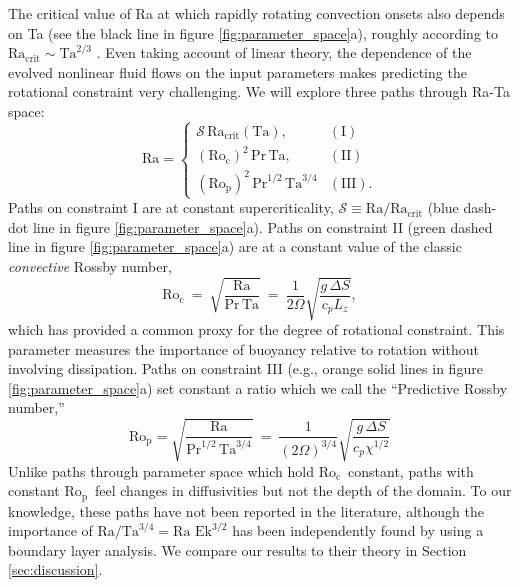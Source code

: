 \documentclass[twocolumn, amsmath, amsfonts, amssymb, trackchanges]{aastex62}
\newcommand{\pro}{\ensuremath{\text{Ro}_{\text{p}}}}
\newcommand{\con}{\ensuremath{\text{Ro}_{\text{c}}}}
\begin{document}
The critical value of Ra at which rapidly rotating convection onsets also depends on Ta (see the black line in figure \ref{fig:parameter_space}a),
roughly according to $\text{Ra}_{\text{crit}} \sim \text{Ta}^{2/3}$ \citep{Chandrasekhar,calkins&all2015a}.
Even taking account of linear theory, the dependence of the evolved nonlinear fluid 
flows on the input parameters makes predicting the rotational constraint very challenging. 
We will explore three paths through Ra-Ta space:
\begin{equation}
    \text{Ra} = 
    \begin{cases}
    \mathcal{S}\,\text{Ra}_\text{crit}(\text{Ta}), & (\text{I})\\
    (\con)^2 \, \text{Pr}\, \text{Ta}, & (\text{II}) \\
    (\pro)^2\, \text{Pr}^{1/2}\, \text{Ta}^{3/4} & (\text{III}).
    \end{cases}
    \label{eqn:paths}
\end{equation}
Paths on constraint I are at constant supercriticality, 
$\mathcal{S} \equiv \text{Ra}/\text{Ra}_{\text{crit}}$
(blue dash-dot line in figure \ref{fig:parameter_space}a).
Paths on constraint II (green dashed line in figure \ref{fig:parameter_space}a)
are at a constant value of the classic
\textit{convective} Rossby number, 
\begin{equation}
\con \ = \   \sqrt{ \frac{\text{Ra}}{\text{Pr}\, \text{Ta} } } \ 
= \  \frac{1}{2 \Omega } \sqrt{\frac{g \, \Delta  S}{c_{p} L_{z}}},
\label{eqn:roc_defn}
\end{equation}
which has provided \citep[e.g., ][]{julien&all1996, brummell&all1996} 
a common proxy for the degree of rotational constraint.
This parameter measures the importance of buoyancy relative to rotation without 
involving dissipation.  
Paths on constraint
III (e.g., orange solid lines in figure \ref{fig:parameter_space}a) 
set constant a ratio which we call the ``Predictive Rossby number,'' 
\begin{equation}
\pro = \sqrt{\frac{\text{Ra}}{\text{Pr}^{1/2}\,\text{Ta}^{3/4}}} \ = \    
\frac{1}{(2 \Omega)^{3/4}} \sqrt{\frac{g \, \Delta  S}{c_{p} \chi^{1/2}}}
\label{eqn:rop_defn}
\end{equation}
Unlike paths through parameter space which hold \con$\,$ constant,
paths with constant \pro$\,$ 
feel changes in diffusivities but not the depth of the domain.
To our knowledge, these paths have not been reported in the literature, 
although the importance of $\text{Ra}/\text{Ta}^{3/4} = \text{Ra Ek}^{3/2}$
has been independently found by \cite{king&all2012} using a boundary layer
analysis. We compare our results to their theory in Section \ref{sec:discussion}. 
\end{document}
